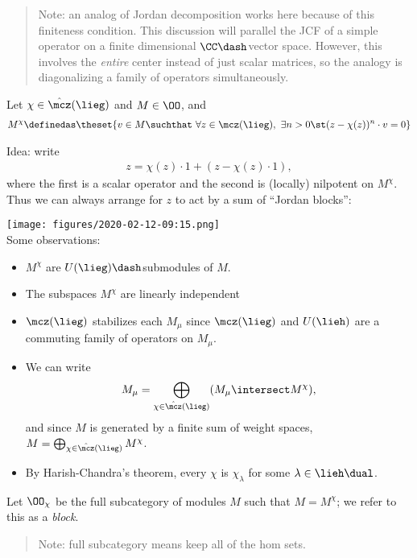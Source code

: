 \begin{quote}
Note: an analog of Jordan decomposition works here because of this
finiteness condition. This discussion will parallel the JCF of a simple
operator on a finite dimensional \(\CC\dash\)vector space. However, this
involves the \emph{entire} center instead of just scalar matrices, so
the analogy is diagonalizing a family of operators simultaneously.
\end{quote}

Let \(\chi \in \hat \mcz(\lieg)\) and \(M\in \OO\), and
\begin{align*}
M^\chi \definedas \theset{v\in M \suchthat ~\forall z\in \mcz(\lieg),~\exists n>0 \st (z- \chi(z))^n \cdot v = 0}
\end{align*}

Idea: write
\begin{align*}
z = \chi(z) \cdot 1 + (z-\chi(z)\cdot 1),
\end{align*} where the first is a scalar operator and the second is
(locally) nilpotent on \(M^\chi\). Thus we can always arrange for \(z\)
to act by a sum of ``Jordan blocks'':

\texttt{[image: figures/2020-02-12-09:15.png]}\\

Some observations:

\begin{itemize}
\tightlist
\item
  \(M^\chi\) are \(U(\lieg)\dash\)submodules of \(M\).
\item
  The subspaces \(M^\chi\) are linearly independent
\item
  \(\mcz(\lieg)\) stabilizes each \(M_\mu\) since \(\mcz(\lieg)\) and
  \(U(\lieh)\) are a commuting family of operators on \(M_\mu\).
\item
  We can write
  \begin{align*}M_\mu = \bigoplus_{\chi \in \hat\mcz(\lieg)} (M_\mu \intersect M^\chi),\end{align*}
  and since \(M\) is generated by a finite sum of weight spaces,
  \(M = \bigoplus_{\chi \in \hat\mcz(\lieg)} M^\chi\).
\item
  By Harish-Chandra's theorem, every \(\chi\) is \(\chi_\lambda\) for
  some \(\lambda \in \lieh\dual\).
\end{itemize}

Let \(\OO_\chi\) be the full subcategory of modules \(M\) such that
\(M = M^\chi\); we refer to this as a \emph{block}.

\begin{quote}
Note: full subcategory means keep all of the hom sets.
\end{quote}

